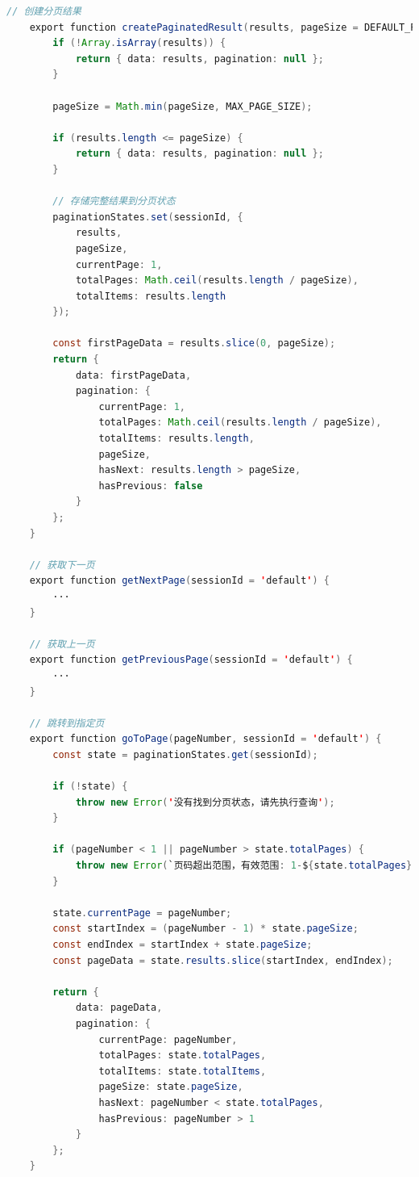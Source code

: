 \documentclass{article}
\begin{document}
	\begin{lstlisting}[language=java, title=结果分页代码逻辑, tabsize=4]
    // 创建分页结果
    export function createPaginatedResult(results, pageSize = DEFAULT_PAGE_SIZE, sessionId = 'default') {
    	if (!Array.isArray(results)) {
    		return { data: results, pagination: null };
    	}
    	
    	pageSize = Math.min(pageSize, MAX_PAGE_SIZE);
    	
    	if (results.length <= pageSize) {
    		return { data: results, pagination: null };
    	}
    	
    	// 存储完整结果到分页状态
    	paginationStates.set(sessionId, {
    		results,
    		pageSize,
    		currentPage: 1,
    		totalPages: Math.ceil(results.length / pageSize),
    		totalItems: results.length
    	});
    	
    	const firstPageData = results.slice(0, pageSize);
    	return {
    		data: firstPageData,
    		pagination: {
    			currentPage: 1,
    			totalPages: Math.ceil(results.length / pageSize),
    			totalItems: results.length,
    			pageSize,
    			hasNext: results.length > pageSize,
    			hasPrevious: false
    		}
    	};
    }
    
    // 获取下一页
    export function getNextPage(sessionId = 'default') {
    	···
    }
    
    // 获取上一页
    export function getPreviousPage(sessionId = 'default') {
    	···
    }
    
    // 跳转到指定页
    export function goToPage(pageNumber, sessionId = 'default') {
    	const state = paginationStates.get(sessionId);
    	
    	if (!state) {
    		throw new Error('没有找到分页状态，请先执行查询');
    	}
    	
    	if (pageNumber < 1 || pageNumber > state.totalPages) {
    		throw new Error(`页码超出范围，有效范围: 1-${state.totalPages}`);
    	}
    	
    	state.currentPage = pageNumber;
    	const startIndex = (pageNumber - 1) * state.pageSize;
    	const endIndex = startIndex + state.pageSize;
    	const pageData = state.results.slice(startIndex, endIndex);
    	
    	return {
    		data: pageData,
    		pagination: {
    			currentPage: pageNumber,
    			totalPages: state.totalPages,
    			totalItems: state.totalItems,
    			pageSize: state.pageSize,
    			hasNext: pageNumber < state.totalPages,
    			hasPrevious: pageNumber > 1
    		}
    	};
    }
    

\end{lstlisting}
\end{document}
